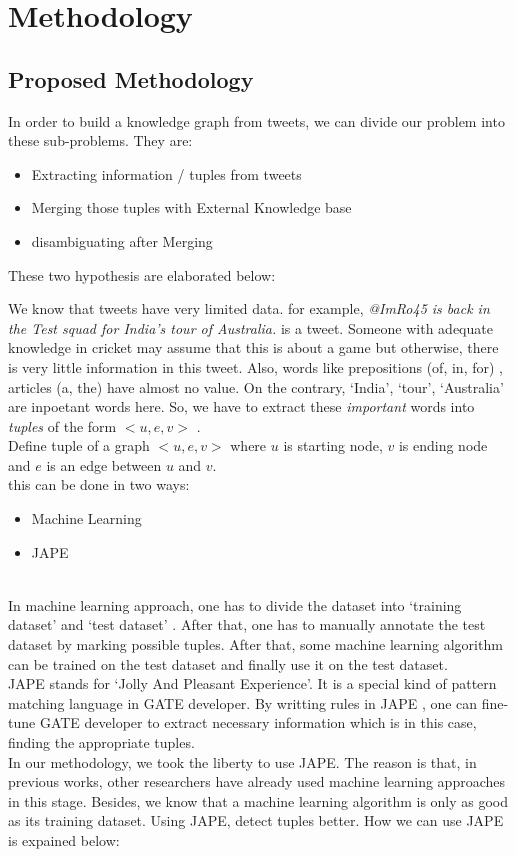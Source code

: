 \chapter{Methodology}\label{ch4}

\section{Proposed Methodology}
In order to build a knowledge graph from tweets, we can divide our problem into these sub-problems. They are:
\begin{itemize}
\item Extracting information / tuples from tweets 
\item Merging those tuples with External Knowledge base
\item disambiguating after Merging 
\end{itemize} 
These two hypothesis are elaborated below: 

We know that tweets have very limited data. for example, 
\textit{ @ImRo45 is back in the Test squad for India’s tour of Australia. } is a tweet. Someone with adequate knowledge in cricket
may assume that this is about a game but otherwise, there is very little information in this tweet. 
Also, words like prepositions (of, in, for) , articles (a, the) have almost no value. On the contrary, `India', `tour', `Australia' 
are inpoetant words here. 
So, we have to extract these \textit{ important } words into \textit{ tuples } of the form $<u, e, v>$ . \\
 Define tuple of a graph $<u, e, v>$ where $ u $ is starting node, $ v $ is ending node and $ e $ is an edge between $ u $ and $v $. \\

this can be done in two ways: 
\begin{itemize}
\item Machine Learning 
\item JAPE 
\end{itemize} 
\\
In machine learning approach, one has to divide the dataset into `training dataset'  and `test dataset' . 
After that, one has to manually annotate the test dataset by marking possible tuples. After that, some machine learning algorithm
 can be trained on the test dataset and finally use it on the test dataset. 
\\ 
JAPE stands for `Jolly And Pleasant Experience'. It is a special kind of pattern matching language in GATE developer. 
By writting rules in JAPE , one can fine-tune GATE developer to extract necessary information which is in this case, 
finding the appropriate tuples. 
\\ 
In our methodology, we took the liberty to use JAPE. The reason is that, in previous works, other researchers  
 have already used machine learning approaches in this stage. Besides, we know 
that a machine learning algorithm is only as good as its training dataset. Using JAPE, detect tuples 
better. How we can use JAPE is expained below: 

